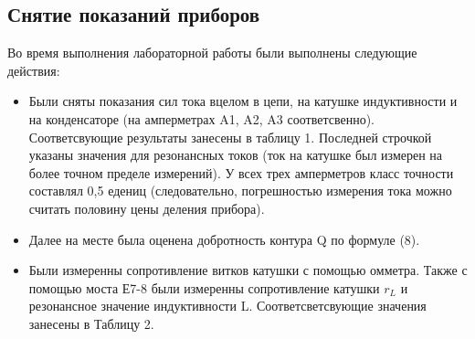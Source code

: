 \documentclass[a4paper, 12pt]{article}
\begin{document}
\subsection{Снятие показаний приборов}
Во время выполнения лабораторной работы были выполнены следующие действия:
\begin{itemize}
    \item Были сняты показания сил тока вцелом в цепи, на катушке индуктивности и на конденсаторе (на амперметрах A1, A2, A3 соответсвенно). Соответсвующие результаты занесены в таблицу 1. Последней строчкой указаны значения для резонансных токов (ток на катушке был измерен на более точном пределе измерений). У всех трех амперметров класс точности составлял 0,5 едениц (следовательно, погрешностью измерения тока можно считать половину цены деления прибора).
    \item Далее на месте была оценена добротность контура Q по формуле (8). 
    \item Были измеренны сопротивление витков катушки с помощью омметра. Также с помощью моста Е7-8 были измеренны сопротивление катушки $r_{L}$ и резонансное значение индуктивности L. Соответсветсвующие значения занесены в Таблицу 2.
\end{itemize}
\end{document}
